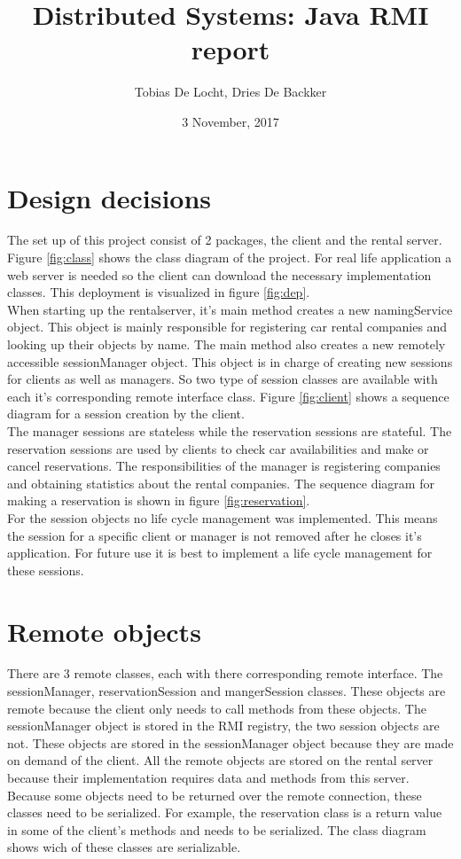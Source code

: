\documentclass[]{article}
\title{Distributed Systems: Java RMI report}
\author{Tobias De Locht, Dries De Backker}
\date{3 November, 2017}
\begin{document}
\maketitle

\section{Design decisions}
The set up of this project consist of 2 packages, the client and the rental server. Figure \ref{fig:class} shows the class diagram of the project. For real life application a web server is needed so the client can download the necessary implementation classes. This deployment is visualized in figure \ref{fig:dep}.
\\
When starting up the rentalserver, it's main method creates a new namingService object. This object is mainly responsible for registering car rental companies and looking up their objects by name. The main method also creates a new remotely accessible sessionManager object. This object is in charge of creating new sessions for clients as well as managers. So two type of session classes are available with each it's corresponding remote interface class. Figure \ref{fig:client} shows a sequence diagram for a session creation by the client.
\\
The manager sessions are stateless while the reservation sessions are stateful. The reservation sessions are used by clients to check car availabilities and make or cancel reservations. The responsibilities of the manager is registering companies and obtaining statistics about the rental companies. The sequence diagram for making a reservation is shown in figure \ref{fig:reservation}.
\\
For the session objects no life cycle management was implemented. This means the session for a specific client or manager is not removed after he closes it's application. For future use it is best to implement a life cycle management for these sessions. 

 
\section{Remote objects}
There are 3 remote classes, each with there corresponding remote interface. The sessionManager, reservationSession and mangerSession classes. These objects are remote because the client only needs to call methods from these objects. The sessionManager object is stored in the RMI registry, the two session objects are not. These objects are stored in the sessionManager object because they are made on demand of the client. All the remote objects are stored on the rental server because their implementation requires data and methods from this server.
\\
Because some objects need to be returned over the remote connection, these classes need to be serialized. For example, the reservation class is a return value in some of the client's methods and needs to be serialized. The class diagram shows wich of these classes are serializable.  
\end{document}

